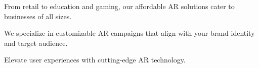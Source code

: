 \documentclass[]{deedy-resume-openfont}
\begin{document}
\begin{minipage}[t]{0.66\textwidth}
\begin{tightemize}
\item From retail to education and gaming, our affordable AR solutions cater to businesses of all sizes.
\item We specialize in customizable AR campaigns that align with your brand identity and target audience.
\item Elevate user experiences with cutting-edge AR technology.
\end{tightemize}
\sectionsep


%
%


\end{minipage}%
\hfill
\end{document}
